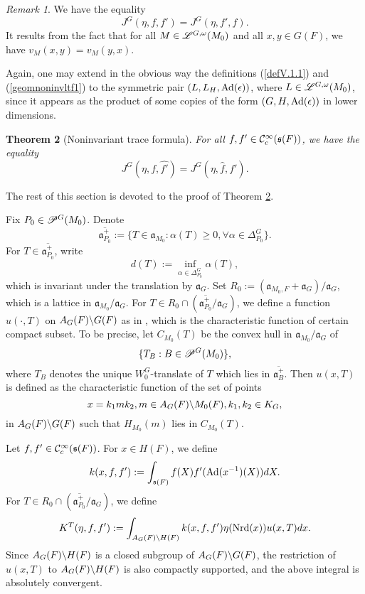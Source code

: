 \documentclass[a4paper]{amsart}
\newcommand{\fa}{{\mathfrak{a}}} \newcommand{\fb}{{\mathfrak{b}}}\newcommand{\fc}{{\mathfrak{c}}} \newcommand{\fd}{{\mathfrak{d}}}
\newcommand{\ov}{\overline}
\newtheorem{thm}{Theorem}[section]
\theoremstyle{definition}
\theoremstyle{remark}
\newtheorem{remark}[thm]{Remark}
\numberwithin{equation}{subsection}
\begin{document}
\begin{remark}\label{rmkV.1.1}
We have the equality
$$ J^G(\eta, f, f')=J^G(\eta, f', f). $$
It results from the fact that for all $M\in\mathscr{L}^{G,\omega}(M_0)$ and all $x,y\in G(F)$, we have $v_M(x,y)=v_M(y,x)$. 
\end{remark}

Again, one may extend in the obvious way the definitions (\ref{defV.1.1}) and (\ref{geomnoninvltf1}) to the symmetric pair $(L, L_H, {\mathrm{Ad}}(\epsilon))$, where $L\in\mathscr{L}^{G,\omega}(M_0)$, since it appears as the product of some copies of the form $(G, H, {\mathrm{Ad}}(\epsilon))$ in lower dimensions. 

\begin{thm}[Noninvariant trace formula]\label{noninvltf1}
For all $f, f'\in{\mathcal {C}}_c^\infty({\mathfrak{s}}(F))$, we have the equality
$$ J^G(\eta, f, \hat{f'})=J^G(\eta, \hat{f}, f'). $$
\end{thm}

The rest of this section is devoted to the proof of Theorem \ref{noninvltf1}. 

Fix $P_0\in\mathscr{P}^G(M_0)$. Denote
$$ \ov{\fa_{P_0}^+}:=\{T\in\fa_{M_0}: \alpha(T)\geq0, \forall\alpha\in\Delta_{P_0}^G\}. $$
For $T\in\ov{\fa_{P_0}^+}$, write
$$ d(T):=\inf_{\alpha\in\Delta_{P_0}^G}\alpha(T), $$
which is invariant under the translation by $\fa_G$. Set $R_0:=(\fa_{M_0,F}+\fa_G)/\fa_G$, which is a lattice in $\fa_{M_0}/\fa_G$. For $T\in R_0\cap(\ov{\fa_{P_0}^+}/\fa_G)$, we define a function $u(\cdot,T)$ on $A_G(F)\backslash G(F)$ as in \cite[p. 21]{MR1114210}, which is the characteristic function of certain compact subset. To be precise, let $C_{M_0}(T)$ be the convex hull in $\fa_{M_0}/\fa_G$ of 
$$ \{T_B: B\in\mathscr{P}^G(M_0)\}, $$
where $T_B$ denotes the unique $W_0^G$-translate of $T$ which lies in $\ov{\fa_B^+}$. Then $u(x,T)$ is defined as the characteristic function of the set of points 
$$ x=k_1mk_2, m\in A_G(F)\backslash M_0(F), k_1,k_2\in K_G, $$
in $A_G(F)\backslash G(F)$ such that $H_{M_0}(m)$ lies in $C_{M_0}(T)$. 

Let $f, f'\in{\mathcal {C}}_c^\infty({\mathfrak{s}}(F))$. For $x\in H(F)$, we define
$$ k(x, f, f'):=\int_{{\mathfrak{s}}(F)} f(X) f'({\mathrm{Ad}}(x^{-1})(X)) dX. $$
For $T\in R_0\cap(\ov{\fa_{P_0}^+}/\fa_G)$, we define 
$$ K^T(\eta, f, f'):=\int_{A_G(F)\backslash H(F)} k(x, f, f') \eta({\mathrm{Nrd}}(x)) u(x, T) dx. $$
Since $A_G(F)\backslash H(F)$ is a closed subgroup of $A_G(F)\backslash G(F)$, the restriction of $u(x, T)$ to $A_G(F)\backslash H(F)$ is also compactly supported, and the above integral is absolutely convergent. 
\end{document}

